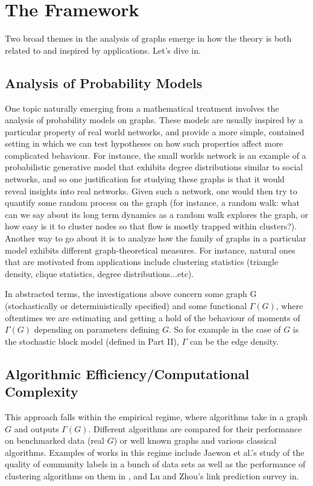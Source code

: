 
\chapter{The Framework}
 Two broad themes in the analysis of graphs emerge in how the theory is both related to and inspired by applications.  Let's dive in.  

\section{Analysis of Probability Models}

One topic naturally emerging from a mathematical treatment involves the analysis of probability models on graphs.  These models are usually inspired by a particular property of real world networks, and provide a more simple, contained setting in which we can test hypotheses on how such properties affect more complicated behaviour.  For instance, the small worlds network is an example of a probabilistic generative model that exhibits degree distributions similar to social networks, and so one justification for studying these graphs is that it would reveal insights into real networks. Given such a network, one would then try to quantify some random process on the graph (for instance, a random walk: what can we say about its long term dynamics as a random walk explores the graph, or how easy is it to cluster nodes so that flow is mostly trapped within clusters?).  Another way to go about it is to analyze how the family of graphs in a particular model exhibits different graph-theoretical measures.  For instance, natural ones that are motivated from applications include clustering statistics (triangle density, clique statistics, degree distributions...etc).  

In abstracted terms, the investigations above concern some graph G (stochastically or deterministically specified) and some functional $\Gamma(G)$, where oftentimes we are estimating and getting a hold of the behaviour of moments of $\Gamma(G)$ depending on parameters defining $G$.  So for example in the case of $G$ is the stochastic block model (defined in Part II), $\Gamma$ can be the edge density.  


\section{Algorithmic Efficiency/Computational Complexity}
This approach falls within the empirical regime, where algorithms take in a graph $G$ and outputs $\Gamma(G)$.  Different algorithms are compared for their performance on benchmarked data (real $G$) or well known graphs and various classical algorithms.  Examples of works in this regime include Jaewon et al.'s study of the quality of community labels in a bunch of data sets as well as the performance of clustering algorithms on them in \cite{JureJaewon_baseline_quality}, and Lu and Zhou's link prediction survey in\cite{link}.

